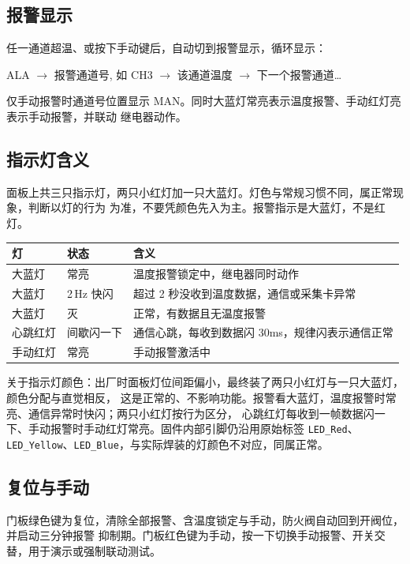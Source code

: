 \documentclass[a4paper,11pt]{ctexart}
\newenvironment{notebox}[1][red!7]{%
  \def\noteboxcolor{#1}%
  \par\smallskip\noindent
  \begin{lrbox}{\noteboxsave}%
  \begin{minipage}{\dimexpr\linewidth-2\fboxsep-2\fboxrule\relax}\small\setlength{\parskip}{2pt}}%
  {\end{minipage}\end{lrbox}%
  \fcolorbox{black!35}{\noteboxcolor}{\usebox{\noteboxsave}}\par\smallskip}
\begin{document}
\subsection{报警显示}
任一通道超温、或按下手动键后，自动切到报警显示，循环显示：
\begin{center}\ttfamily
ALA $\to$ 报警通道号, 如 CH3 $\to$ 该通道温度 $\to$ 下一个报警通道\dots
\end{center}
仅手动报警时通道号位置显示 MAN。同时大蓝灯常亮表示温度报警、手动红灯亮表示手动报警，并联动
继电器动作。

\subsection{指示灯含义}\label{sub:led}
面板上共三只指示灯，两只小红灯加一只大蓝灯。灯色与常规习惯不同，属正常现象，判断以灯的行为
为准，不要凭颜色先入为主。报警指示是大蓝灯，不是红灯。
\renewcommand{\arraystretch}{1.3}
\begin{center}
\begin{tabular}{|l|l|L{7.2cm}|}
\hline
灯 & 状态 & 含义\\
\hline
大蓝灯 & 常亮 & 温度报警锁定中，继电器同时动作\\
\hline
大蓝灯 & 2\,Hz 快闪 & 超过 2 秒没收到温度数据，通信或采集卡异常\\
\hline
大蓝灯 & 灭 & 正常，有数据且无温度报警\\
\hline
心跳红灯 & 间歇闪一下 & 通信心跳，每收到数据闪 30ms，规律闪表示通信正常\\
\hline
手动红灯 & 常亮 & 手动报警激活中\\
\hline
\end{tabular}
\end{center}
\renewcommand{\arraystretch}{1.0}
\begin{notebox}
关于指示灯颜色：出厂时面板灯位间距偏小，最终装了两只小红灯与一只大蓝灯，颜色分配与直觉相反，
这是正常的、不影响功能。报警看大蓝灯，温度报警时常亮、通信异常时快闪；两只小红灯按行为区分，
心跳红灯每收到一帧数据闪一下、手动报警时手动红灯常亮。固件内部引脚仍沿用原始标签
\texttt{LED\_Red}、\texttt{LED\_Yellow}、\texttt{LED\_Blue}，与实际焊装的灯颜色不对应，同属正常。
\end{notebox}

\subsection{复位与手动}
门板绿色键为复位，清除全部报警、含温度锁定与手动，防火阀自动回到开阀位，并启动三分钟报警
抑制期。门板红色键为手动，按一下切换手动报警、开关交替，用于演示或强制联动测试。
\end{document}

